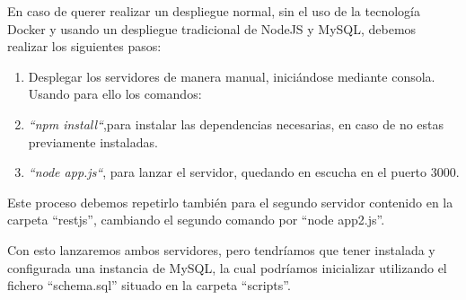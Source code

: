 En caso de querer realizar un despliegue normal, sin el uso de la tecnología Docker y usando un despliegue tradicional de NodeJS y MySQL, debemos realizar los siguientes pasos:

\begin{enumerate}
\item Desplegar los servidores de manera manual, iniciándose mediante
  consola. Usando para ello los comandos:

  \item \textit{“npm install“},para instalar las dependencias necesarias,
    en caso de no estas previamente instaladas.
  \item \textit{“node app.js“}, para lanzar el servidor, quedando en
    escucha en el puerto 3000.
\end{enumerate}

  Este proceso debemos repetirlo también para el segundo servidor contenido
  en la carpeta “restjs”, cambiando el segundo comando por “node app2.js”.

  Con esto lanzaremos ambos servidores, pero tendríamos que tener instalada
  y configurada una instancia de MySQL, la cual podríamos inicializar
  utilizando el fichero “schema.sql” situado en la carpeta “scripts”.



  

